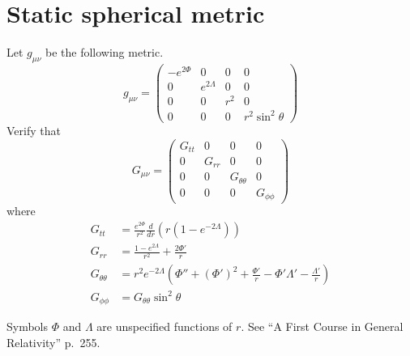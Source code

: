 \documentclass[12pt]{article}
\begin{document}
\section*{Static spherical metric}

Let $g_{\mu\nu}$ be the following metric.
$$
g_{\mu\nu}=
\begin{pmatrix}
-e^{2\Phi} & 0 & 0 & 0\\
0 & e^{2\Lambda} & 0 & 0\\
0 & 0 & r^2 & 0\\
0 & 0 & 0 & r^2\sin^2\theta
\end{pmatrix}
$$
Verify that
$$
G_{\mu\nu}=\begin{pmatrix}
G_{tt} & 0 & 0 & 0\\
0 & G_{rr} & 0 & 0\\
0 & 0 & G_{\theta\theta} & 0\\
0 & 0 & 0 & G_{\phi\phi}
\end{pmatrix}
$$
where
\begin{align*}
G_{tt}&=\frac{e^{2\Phi}}{r^2}\frac{d}{dr}\left(r\left(1-e^{-2\Lambda}\right)\right)
\\[2ex]
G_{rr}&=\frac{1-e^{2\Lambda}}{r^2}+\frac{2\Phi'}{r}
\\[2ex]
G_{\theta\theta}&=r^2e^{-2\Lambda}\left(\Phi''+(\Phi')^2+\frac{\Phi'}{r}-\Phi'\Lambda'-\frac{\Lambda'}{r}\right)
\\[2ex]
G_{\phi\phi}&=G_{\theta\theta}\sin^2\theta
\end{align*}

Symbols $\Phi$ and $\Lambda$ are unspecified functions of $r$.
See ``A First Course in General Relativity'' p.~255.
\end{document}

